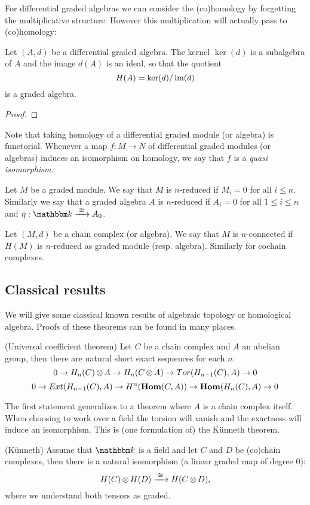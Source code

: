 For differential graded algebras we can consider the (co)homology by forgetting the multiplicative structure. However this multiplication will actually pass to (co)homology:

\begin{lemma}
	Let $(A, d)$ be a differential graded algebra. The kernel $\ker(d)$ is a subalgebra of $A$ and the image $d(A)$ is an ideal, so that the quotient
	$$ H(A) = \ker(d) / \operatorname*{im}(d) $$
	is a graded algebra.
\end{lemma}
\begin{proof}
\end{proof}

Note that taking homology of a differential graded module (or algebra) is functorial. Whenever a map $f: M \to N$ of differential graded modules (or algebras) induces an isomorphism on homology, we say that $f$ is a \emph{quasi isomorphism}.

\begin{definition}
	Let $M$ be a graded module. We say that $M$ is $n$-reduced if $M_i = 0$ for all $i \leq n$. Similarly we say that a graded algebra $A$ is $n$-reduced if $A_i = 0$ for all $1 \leq i \leq n$ and $\eta: \k \tot{\iso} A_0$.

	Let $(M, d)$ be a chain complex (or algebra). We say that $M$ is $n$-connected if $H(M)$ is $n$-reduced as graded module (resp. algebra). Similarly for cochain complexes.
\end{definition}


\subsection{Classical results}

We will give some classical known results of algebraic topology or homological algebra. Proofs of these theorems can be found in many places. 

\begin{theorem}
	(Universal coefficient theorem) Let $C$ be a chain complex and $A$ an abelian group, then there are natural short exact sequences for each $n$:
	$$ 0 \to H_n(C) \operatorname*{\otimes} A \to H_n(C \operatorname*{\otimes} A) \to Tor(H_{n-1}(C), A) \to 0 $$
	$$ 0 \to Ext(H_{n-1}(C), A) \to H^n(\mathbf{Hom}(C, A)) \to \mathbf{Hom}(H_n(C), A) \to 0 $$
\end{theorem}

The first statement generalizes to a theorem where $A$ is a chain complex itself. When choosing to work over a field the torsion will vanish and the exactness will induce an isomorphism. This is (one formulation of) the Künneth theorem.

\begin{theorem}
	(Künneth) Assume that $\k$ is a field and let $C$ and $D$ be (co)chain complexes, then there is a natural isomorphism (a linear graded map of degree $0$):
	$$ H(C) \operatorname*{\otimes} H(D) \xrightarrow{\,\,{\cong}\,\,} H(C \operatorname*{\otimes} D), $$
	where we understand both tensors as graded.
\end{theorem}

